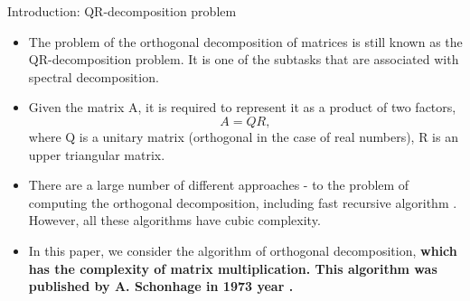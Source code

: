 \documentclass[pdf]{beamer}
\begin{document}
 
\begin{frame}{Introduction: QR-decomposition problem}

 \begin{itemize}
 \item 
The problem of the orthogonal decomposition of matrices is still known as the QR-decomposition problem. 
It is one of the subtasks that are associated with spectral decomposition. 
 \item 
Given the matrix A, it is required to represent it as a product of two factors, $$A=QR,$$ where Q is a unitary matrix (orthogonal in the case of real numbers), R is an upper triangular matrix.
 \item 
There are a large number of different approaches \cite{1}-\cite{4} to the problem of computing the orthogonal decomposition, including fast recursive algorithm \cite{5}. 
However,  all these algorithms have cubic complexity. 
 \item 
In this paper, we consider the algorithm of orthogonal decomposition, \bf{which has the complexity of matrix multiplication}. This algorithm was published by A. Schonhage in 1973 year \cite{0}.
 \\
  \end{itemize}
\end{frame}


 
\end{document}
